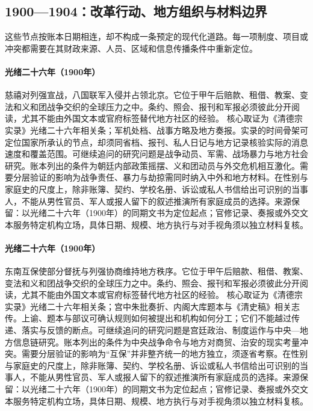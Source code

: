 \subsection{1900—1904：改革行动、地方组织与材料边界}
这些节点按账本日期相连，却不构成一条预定的现代化道路。每一项制度、项目或冲突都需要在其财政来源、人员、区域和信息传播条件中重新定位。
\hypertarget{public:EQ-1900-BOXER-WAR}{}\paragraph{光绪二十六年（1900年）}慈禧对列强宣战，八国联军入侵并占领北京。它位于甲午后赔款、租借、教案、变法和义和团战争交织的全球压力之中。条约、照会、报刊和军报必须彼此分开阅读，尤其不能由外国文本或官府标签替代地方社区的经验。 核心取证为《清德宗实录》光绪二十六年相关条；军机处档、战事方略及地方奏报。实录的时间骨架可定位国家所承认的节点，却须同省档、报刊、私人日记与地方记录核验实际的消息速度和覆盖范围。可继续追问的研究问题是战争动员、军需、战场暴力与地方社会研究。账本列出的条件为朝廷内部政策摇摆、义和团动员与外交危机相互激化。需要分层验证的影响为战争责任、暴力与劫掠需同时纳入中外和地方材料。在性别与家庭史的尺度上，除非账簿、契约、学校名册、诉讼或私人书信给出可识别的当事人，不能从男性官员、军人或报人留下的叙述推演所有家庭成员的选择。来源保留：以光绪二十六年（1900年）的同期文书为定位起点；官修记录、奏报或外交文本服务特定机构立场，具体日期、规模、地方执行与对手视角须以独立材料复核。
\hypertarget{public:EQ-1900-SOUTHEAST-MUTUAL-PROTECTION}{}\paragraph{光绪二十六年（1900年）}东南互保使部分督抚与列强协商维持地方秩序。它位于甲午后赔款、租借、教案、变法和义和团战争交织的全球压力之中。条约、照会、报刊和军报必须彼此分开阅读，尤其不能由外国文本或官府标签替代地方社区的经验。 核心取证为《清德宗实录》光绪二十六年相关条；宫中朱批奏折、内阁大库题本与《清史稿》相关志传。上谕、题本与部议可确认规则如何被提出和机构如何分工；它们不能越过传递、落实与反馈的断点。可继续追问的研究问题是宫廷政治、制度运作与中央—地方信息链研究。账本列出的条件为中央战争命令与地方对商贸、治安的现实考量冲突。需要分层验证的影响为“互保”并非整齐统一的地方独立，须逐省考察。在性别与家庭史的尺度上，除非账簿、契约、学校名册、诉讼或私人书信给出可识别的当事人，不能从男性官员、军人或报人留下的叙述推演所有家庭成员的选择。来源保留：以光绪二十六年（1900年）的同期文书为定位起点；官修记录、奏报或外交文本服务特定机构立场，具体日期、规模、地方执行与对手视角须以独立材料复核。
